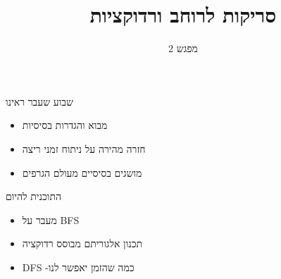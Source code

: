 \documentclass[handout]{beamer}
\begin{document}
	\title{ סריקות לרוחב ורדוקציות}
	\subtitle{מפגש 2}
	\date{}
	
	
	\maketitle
\begin{frame}{שבוע שעבר ראינו}
\pause
\begin{itemize}[<+->]
	\item מבוא והגדרות בסיסיות 
	\item חזרה מהירה על ניתוח זמני ריצה
	\item מושגים בסיסיים מעולם הגרפים
\end{itemize}
\end{frame}

\begin{frame}{התוכנית להיום}
\pause
\begin{itemize}[<+->]
	\item מעבר על BFS
	\item תכנון אלגוריתם מבוסס רדוקציה
	\item  DFS  -כמה שהזמן יאפשר לנו 
\end{itemize}
\end{frame}
\end{document}
